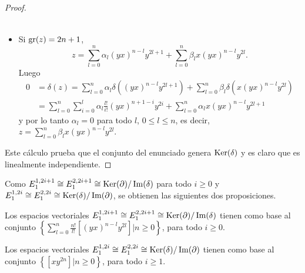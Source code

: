 \documentclass[fleqn,../tesis.tex]{subfiles}
\begin{document}
\begin{proof}
\begin{itemize}
\begin{align*}
            \end{align*}
         \item Si $\operatorname{gr}(z) = 2n + 1$,
         \[
             z= \sum_{l = 0}^{n}\alpha_l(yx)^{n - l}y^{2l + 1}  +\sum_{l = 0}^{n}\beta_l x(yx)^{n - l}y^{2l}.            
         \]
         Luego
         \begin{align*}
              0 &= \delta(z) = \sum_{l = 0}^{n}\alpha_l\delta \left((yx)^{n - l}y^{2l + 1}\right)
                  + \sum_{l = 0}^{n}\beta_l \delta \left( x(yx)^{n - l}y^{2l}\right)\\
                &= \sum_{l = 0}^{n}\sum_{i = 0}^{l}\alpha_l \frac{l!}{i!}(yx)^{n + 1 - i}y^{2i} + \sum_{l = 0}^{n}\alpha_l x(yx)^{n - l}y^{2l + 1}
         \end{align*}
         y por lo tanto $\alpha_l = 0$ para todo $l$, $0 \leq l \leq n$, es decir,  $z=\sum_{l = 0}^{n}\beta_l x(yx)^{n - l}y^{2l}$.
    \end{itemize}
    Este cálculo prueba que el conjunto del enunciado genera $\operatorname{Ker}(\delta)$ y es claro que es linealmente independiente.
\end{proof}

Como $E_{1}^{1, 2i + 1} \cong E_{1}^{2, 2i + 1} \cong \operatorname{Ker}(\partial)/ \operatorname{Im}(\delta)$ para todo $i \geq 0$
y $E_{1}^{1, 2i} \cong E_{1}^{2, 2i} \cong \operatorname{Ker}(\delta)/ \operatorname{Im}(\partial)$, se obtienen las siguientes dos proposiciones.

\begin{prop}
    Los espacios vectoriales $E_{1}^{1, 2i + 1} \cong E_{1}^{2, 2i + 1} \cong \operatorname{Ker}(\partial)/ \operatorname{Im}(\delta)$ tienen como base
    al conjunto $\left\lbrace \sum_{l = 0}^{n}\frac{n!}{l!}\left[(yx)^{n - l}y^{2l}\right] | n \geq 0 \right\rbrace$, para todo $i \geq 0$.
\end{prop}

\begin{prop}
    Los espacios vectoriales $E_{1}^{1, 2i} \cong E_{1}^{2, 2i} \cong \operatorname{Ker}(\delta)/ \operatorname{Im}(\partial)$ tienen como base
    al conjunto $\left\lbrace \left[xy^{2n}\right] | n \geq 0 \right\rbrace$, para todo $i \geq 1$.
\end{prop}
\end{document}
